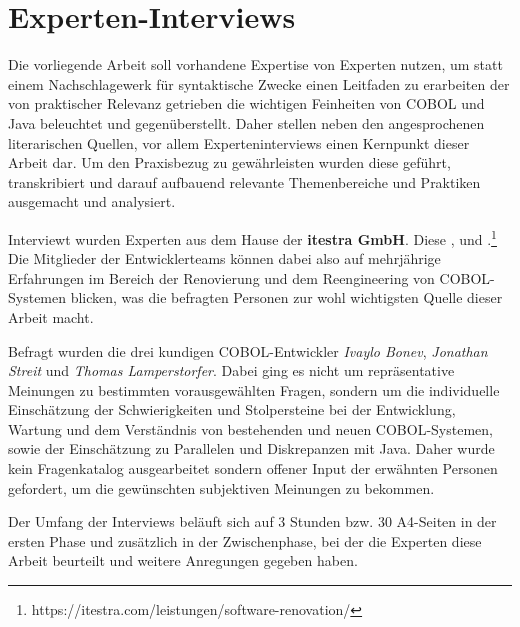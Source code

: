 \section{Experten-Interviews}\label{interviews}
Die vorliegende Arbeit soll vorhandene Expertise von Experten nutzen, um statt einem Nachschlagewerk für syntaktische Zwecke einen Leitfaden zu erarbeiten der von praktischer Relevanz getrieben die wichtigen Feinheiten von COBOL und Java beleuchtet und gegenüberstellt. Daher stellen neben den angesprochenen literarischen Quellen, vor allem Experteninterviews einen Kernpunkt dieser Arbeit dar. Um den Praxisbezug zu gewährleisten wurden diese geführt, transkribiert und darauf aufbauend relevante Themenbereiche und Praktiken ausgemacht und analysiert.

Interviewt wurden Experten aus dem Hause der \textbf{itestra GmbH}. Diese ,  und .\footnote{\label{itestraFootnote}https://itestra.com/leistungen/software-renovation/} Die Mitglieder der Entwicklerteams können dabei also auf mehrjährige Erfahrungen im Bereich der Renovierung und dem Reengineering von COBOL-Systemen blicken, was die befragten Personen zur wohl wichtigsten Quelle dieser Arbeit macht.

Befragt wurden die drei kundigen COBOL-Entwickler \textit{Ivaylo Bonev}, \textit{Jonathan Streit} und \textit{Thomas Lamperstorfer}. Dabei ging es nicht um repräsentative Meinungen zu bestimmten vorausgewählten Fragen, sondern um die individuelle Einschätzung der Schwierigkeiten und Stolpersteine bei der Entwicklung, Wartung und dem Verständnis von bestehenden und neuen COBOL-Systemen, sowie der Einschätzung zu Parallelen und Diskrepanzen mit Java. Daher wurde kein Fragenkatalog ausgearbeitet sondern offener Input der erwähnten Personen gefordert, um die gewünschten subjektiven Meinungen zu bekommen. 

Der Umfang der Interviews beläuft sich auf 3 Stunden bzw. 30 A4-Seiten in der ersten Phase und zusätzlich  in der Zwischenphase, bei der die Experten diese Arbeit beurteilt und weitere Anregungen gegeben haben.